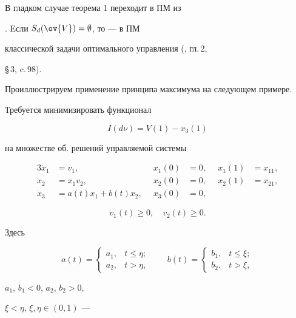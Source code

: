 В гладком случае теорема 1 переходит в ПМ из


\cite{M92}. Eсли $S_d(\ov{V})=\emptyset$, то --- в ПМ


классической задачи оптимального управления (\cite{Arut}, гл.\,2,


\S\,3, c.\,98).





Проиллюстрируем применение принципа максимума на следующем примере.


Требуется минимизировать функционал


$$


I(d\nu)=V(1)-x_3(1)


$$


на множестве об. решений управляемой системы


\begin{alignat*}{3}


\Dot x_1 &=v_1, &\ \; x_1(0)&=0, &\ \; x_1(1)&=x_{11}, \\


\Dot x_2 &=x_1v_2, &\ \; x_2(0)&=0, &\ \; x_2(1)&=x_{21}, \\


\Dot x_3 &=a(t)x_1+b(t)x_2, &\ \; x_3(0)&=0, &\ \; &\phantom{=}


\end{alignat*}


$$


v_1(t)\geq 0, \quad v_2(t)\geq 0.


$$


Здесь


$$


a(t)=


\begin{cases}


a_1, & t\leq \eta;\\ a_2, & t>\eta,


\end{cases}


\qquad


b(t)=


\begin{cases}


b_1, & t\leq \xi;\\ b_2, & t>\xi,


\end{cases}


$$


$a_1,\, b_1< 0$, $a_2,\, b_2>0$,


$\xi<\eta$, $\xi, \eta \in (0,1)$ ---


